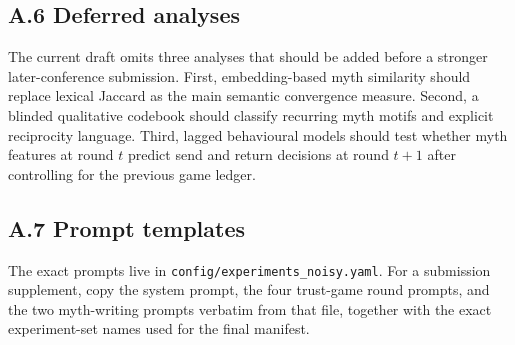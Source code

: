 \documentclass[10pt,letterpaper]{article}
\begin{document}
\subsection{A.6 Deferred analyses}\label{a.6-deferred-analyses}

The current draft omits three analyses that should be added before a
stronger later-conference submission. First, embedding-based myth
similarity should replace lexical Jaccard as the main semantic
convergence measure. Second, a blinded qualitative codebook should
classify recurring myth motifs and explicit reciprocity language. Third,
lagged behavioural models should test whether myth features at round
\(t\) predict send and return decisions at round \(t+1\) after
controlling for the previous game ledger.

\subsection{A.7 Prompt templates}\label{a.7-prompt-templates}

The exact prompts live in \texttt{config/experiments\_noisy.yaml}. For a
submission supplement, copy the system prompt, the four trust-game round
prompts, and the two myth-writing prompts verbatim from that file,
together with the exact experiment-set names used for the final
manifest.



\end{document}
